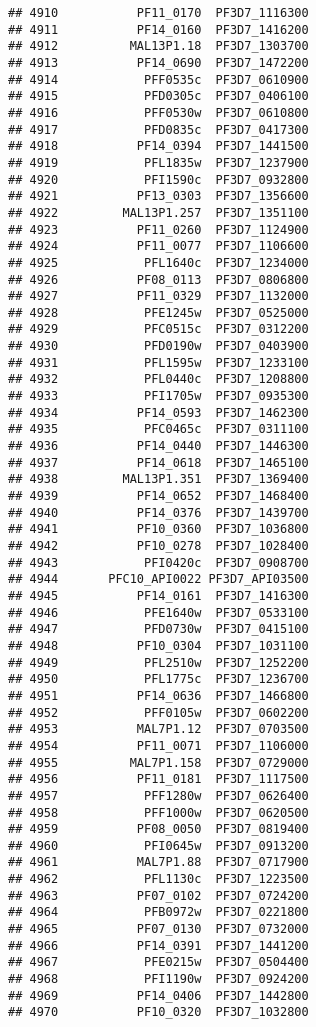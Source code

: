 \documentclass[12pt, a4paper]{article}\usepackage[]{graphicx}\usepackage[]{color}
\makeatletter
\newenvironment{kframe}{%
 \def\at@end@of@kframe{}%
 \ifinner\ifhmode%
  \def\at@end@of@kframe{\end{minipage}}%
  \begin{minipage}{\columnwidth}%
 \fi\fi%
 \def\FrameCommand##1{\hskip\@totalleftmargin \hskip-\fboxsep
 \colorbox{shadecolor}{##1}\hskip-\fboxsep
     \hskip-\linewidth \hskip-\@totalleftmargin \hskip\columnwidth}%
 \MakeFramed {\advance\hsize-\width
   \@totalleftmargin\z@ \linewidth\hsize
   \@setminipage}}%
 {\par\unskip\endMakeFramed%
 \at@end@of@kframe}
\newenvironment{knitrout}{}{} %
\makeatother
\begin{document}
\begin{knitrout}
\begin{kframe}
\begin{verbatim}
## 4910           PF11_0170  PF3D7_1116300
## 4911           PF14_0160  PF3D7_1416200
## 4912          MAL13P1.18  PF3D7_1303700
## 4913           PF14_0690  PF3D7_1472200
## 4914            PFF0535c  PF3D7_0610900
## 4915            PFD0305c  PF3D7_0406100
## 4916            PFF0530w  PF3D7_0610800
## 4917            PFD0835c  PF3D7_0417300
## 4918           PF14_0394  PF3D7_1441500
## 4919            PFL1835w  PF3D7_1237900
## 4920            PFI1590c  PF3D7_0932800
## 4921           PF13_0303  PF3D7_1356600
## 4922         MAL13P1.257  PF3D7_1351100
## 4923           PF11_0260  PF3D7_1124900
## 4924           PF11_0077  PF3D7_1106600
## 4925            PFL1640c  PF3D7_1234000
## 4926           PF08_0113  PF3D7_0806800
## 4927           PF11_0329  PF3D7_1132000
## 4928            PFE1245w  PF3D7_0525000
## 4929            PFC0515c  PF3D7_0312200
## 4930            PFD0190w  PF3D7_0403900
## 4931            PFL1595w  PF3D7_1233100
## 4932            PFL0440c  PF3D7_1208800
## 4933            PFI1705w  PF3D7_0935300
## 4934           PF14_0593  PF3D7_1462300
## 4935            PFC0465c  PF3D7_0311100
## 4936           PF14_0440  PF3D7_1446300
## 4937           PF14_0618  PF3D7_1465100
## 4938         MAL13P1.351  PF3D7_1369400
## 4939           PF14_0652  PF3D7_1468400
## 4940           PF14_0376  PF3D7_1439700
## 4941           PF10_0360  PF3D7_1036800
## 4942           PF10_0278  PF3D7_1028400
## 4943            PFI0420c  PF3D7_0908700
## 4944       PFC10_API0022 PF3D7_API03500
## 4945           PF14_0161  PF3D7_1416300
## 4946            PFE1640w  PF3D7_0533100
## 4947            PFD0730w  PF3D7_0415100
## 4948           PF10_0304  PF3D7_1031100
## 4949            PFL2510w  PF3D7_1252200
## 4950            PFL1775c  PF3D7_1236700
## 4951           PF14_0636  PF3D7_1466800
## 4952            PFF0105w  PF3D7_0602200
## 4953           MAL7P1.12  PF3D7_0703500
## 4954           PF11_0071  PF3D7_1106000
## 4955          MAL7P1.158  PF3D7_0729000
## 4956           PF11_0181  PF3D7_1117500
## 4957            PFF1280w  PF3D7_0626400
## 4958            PFF1000w  PF3D7_0620500
## 4959           PF08_0050  PF3D7_0819400
## 4960            PFI0645w  PF3D7_0913200
## 4961           MAL7P1.88  PF3D7_0717900
## 4962            PFL1130c  PF3D7_1223500
## 4963           PF07_0102  PF3D7_0724200
## 4964            PFB0972w  PF3D7_0221800
## 4965           PF07_0130  PF3D7_0732000
## 4966           PF14_0391  PF3D7_1441200
## 4967            PFE0215w  PF3D7_0504400
## 4968            PFI1190w  PF3D7_0924200
## 4969           PF14_0406  PF3D7_1442800
## 4970           PF10_0320  PF3D7_1032800

\end{verbatim}
\end{kframe}
\end{knitrout}
\end{document}
